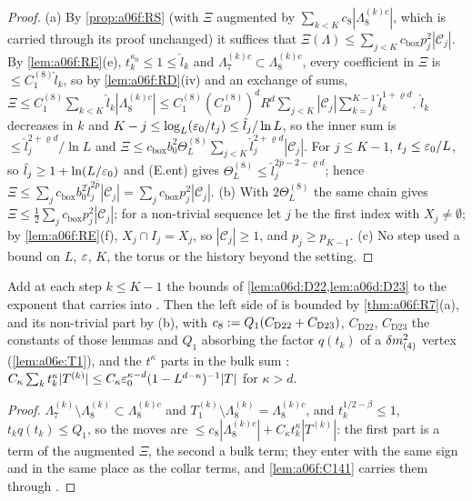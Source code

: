 \begin{proof}
(a) By \cref{prop:a06f:RS} (with $\Xi$ augmented by $\sum_{k<K}c_8|\Lambda^{(k)c}_8|$, which is carried through its proof unchanged) it suffices that $\Xi(\Lambda)\le\sum_{j<K}c_{\mathrm{box}}p_j^2|\mathcal C_j|$. By \cref{lem:a06f:RE}(e), $t_k^{\kappa_0}\le1\le\hat l_k$ and $\Lambda^{(k)c}_7\subset\Lambda^{(k)c}_8$, every coefficient in $\Xi$ is $\le C^{(8)}_1\hat l_k$, so by \cref{lem:a06f:RD}(iv) and an exchange of sums, $\Xi\le C^{(8)}_1\sum_{k<K}\hat l_k|\Lambda^{(k)c}_8|\le C^{(8)}_1(C^{(8)}_D)^dR^d\sum_{j<K}|\mathcal C_j|\sum_{k=j}^{K-1}\hat l_k^{1+\varrho d}$. $\hat l_k$ decreases in $k$ and $K-j\le\log_L(\varepsilon_0/t_j)\le\hat l_j/\ln L$, so the inner sum is $\le\hat l_j^{2+\varrho d}/\ln L$ and $\Xi\le c_{\mathrm{box}}b_0^2\Theta^{(8)}_L\sum_{j<K}\hat l_j^{2+\varrho d}|\mathcal C_j|$. For $j\le K-1$, $t_j\le\varepsilon_0/L$, so $\hat l_j\ge1+\ln(L/\varepsilon_0)$ and (E.ent) gives $\Theta^{(8)}_L\le\hat l_j^{2\bar p-2-\varrho d}$; hence $\Xi\le\sum_jc_{\mathrm{box}}b_0^2\hat l_j^{2\bar p}|\mathcal C_j|=\sum_jc_{\mathrm{box}}p_j^2|\mathcal C_j|$. (b) With $2\Theta^{(8)}_L$ the same chain gives $\Xi\le\frac12\sum_jc_{\mathrm{box}}p_j^2|\mathcal C_j|$; for a non-trivial sequence let $j$ be the first index with $X_j\ne\emptyset$; by \cref{lem:a06f:RE}(f), $X_j\cap I_j=X_j$, so $|\mathcal C_j|\ge1$, and $p_j\ge p_{K-1}$. (c) No step used a bound on $L$, $\varepsilon$, $K$, the torus or the history beyond the setting.
\end{proof}

\begin{proposition}\label{prop:a06f:D2C}
Add at each step $k\le K-1$ the bounds of \cref{lem:a06d:D22,lem:a06d:D23} to the exponent that \cite[(2.43), (2.115)]{Ba2} carries into \cite[(2.117), (3.42)]{Ba2}. Then the left side of \cite[(3.42)]{Ba2} is bounded by \cref{thm:a06f:R7}(a), and its non-trivial part by \textup{(b)}, with $c_8:= Q_1(C_{\mathrm{D22}}+C_{\mathrm{D23}})$, $C_{\mathrm{D22}}$, $C_{\mathrm{D23}}$ the constants of those lemmas and $Q_1$ absorbing the factor $q(t_k)$ of a $\delta m^2_{(4)}$ vertex (\cref{lem:a06e:T1}), and the $t^\kappa$ parts in the bulk sum \cite[(2.118)]{Ba2}: $C_\kappa\sum_kt_k^\kappa|T^{(k)}|\le C_\kappa\varepsilon_0^{\kappa-d}(1-L^{d-\kappa})^{-1}|T|$ for $\kappa>d$.
\end{proposition}

\begin{proof}
$\Lambda^{(k)}_7\setminus\Lambda^{(k)}_8\subset\Lambda^{(k)c}_8$ and $T^{(k)}_1\setminus\Lambda^{(k)}_8=\Lambda^{(k)c}_8$, and $t_k^{1/2-\beta}\le1$, $t_kq(t_k)\le Q_1$, so the moves are $\le c_8|\Lambda^{(k)c}_8|+C_\kappa t_k^\kappa|T^{(k)}|$: the first part is a term of the augmented $\Xi$, the second a bulk term; they enter \cite[(2.117)]{Ba2} with the same sign and in the same place as the collar terms, and \cref{lem:a06f:C141} carries them through \cite[Sect.~3A]{Ba2}.
\end{proof}

